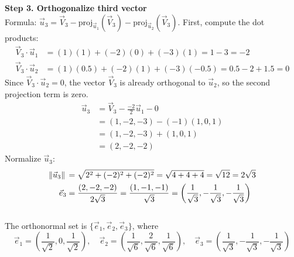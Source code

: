 \documentclass{article}
\begin{document}
\textbf{Step 3. Orthogonalize third vector}
\\
Formula: $\vec{u}_{3} = \vec{V}_{3} - \text{proj}_{\vec{u}_{1}}(\vec{V}_{3}) - \text{proj}_{\vec{u}_{2}}(\vec{V}_{3})$.
First, compute the dot products:
\begin{align*}
	\vec{V}_{3} \cdot \vec{u}_{1} & = (1)(1) + (-2)(0) + (-3)(1) = 1 - 3 = -2             \\
	\vec{V}_{3} \cdot \vec{u}_{2} & = (1)(0.5) + (-2)(1) + (-3)(-0.5) = 0.5 - 2 + 1.5 = 0
\end{align*}
Since $\vec{V}_{3} \cdot \vec{u}_{2} = 0$, the vector $\vec{V}_{3}$ is already orthogonal to $\vec{u}_{2}$, so the second projection term is zero.
\begin{align*}
	\vec{u}_{3} & = \vec{V}_{3} - \frac{-2}{2}\vec{u}_{1} - 0 \\
	            & = (1, -2, -3) - (-1)(1, 0, 1)               \\
	            & = (1, -2, -3) + (1, 0, 1)                   \\
	            & = (2, -2, -2)
\end{align*}
Normalize $\vec{u}_{3}$:
\begin{align*}
	\norm*{\vec{u}_{3}} & = \sqrt{2^2 + (-2)^2 + (-2)^2} = \sqrt{4 + 4 + 4} = \sqrt{12} = 2\sqrt{3} \\
	\vec{e}_{3}         & = \frac{(2, -2, -2)}{2\sqrt{3}} = \frac{(1, -1, -1)}{\sqrt{3}}
	= \left( \frac{1}{\sqrt{3}}, -\frac{1}{\sqrt{3}}, -\frac{1}{\sqrt{3}} \right)
\end{align*}
\\
The orthonormal set is $\{ \vec{e}_{1}, \vec{e}_{2}, \vec{e}_{3} \}$, where
\[
	\vec{e}_{1} =
	\left(
	\frac{1}{\sqrt{2}}, 0, \frac{1}{\sqrt{2}}
	\right), \quad
	\vec{e}_{2} =
	\left(
	\frac{1}{\sqrt{6}}, \frac{2}{\sqrt{6}}, \frac{1}{\sqrt{6}}
	\right), \quad
	\vec{e}_{3} =
	\left(
	\frac{1}{\sqrt{3}}, -\frac{1}{\sqrt{3}}, -\frac{1}{\sqrt{3}}
	\right)
\]

\pagebreak

\end{document}
